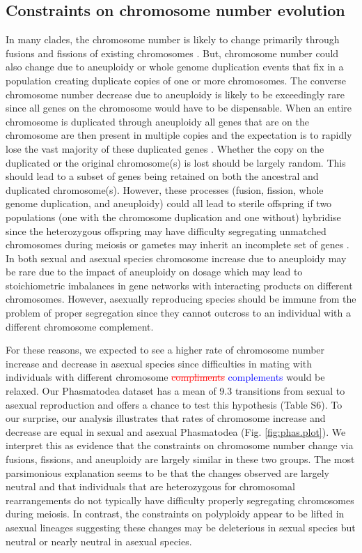 \documentclass[]{rsos}%
\begin{document}
\subsection{Constraints on chromosome number evolution}
In many clades, the chromosome number is likely to change primarily through fusions and fissions of existing chromosomes \cite{sved2016, blackmon2019meiotic}.
But, chromosome number could also change due to aneuploidy or whole genome duplication events that fix in a population creating duplicate copies of one or more chromosomes.
The converse chromosome number decrease due to aneuploidy is likely to be exceedingly rare since all genes on the chromosome would have to be dispensable.
When an entire chromosome is duplicated through aneuploidy all genes that are on the chromosome are then present in multiple copies and the expectation is to rapidly lose the vast majority of these duplicated genes \cite{ohno}.
Whether the copy on the duplicated or the original chromosome(s) is lost should be largely random.
This should lead to a subset of genes being retained on both the ancestral and duplicated chromosome(s).
However, these processes (fusion, fission, whole genome duplication, and aneuploidy) could all lead to sterile offspring if two populations (one with the chromosome duplication and one without) hybridise since the heterozygous offspring may have difficulty segregating unmatched chromosomes during meiosis or gametes may inherit an incomplete set of genes \cite{white1978}.
In both sexual and asexual species chromosome increase due to aneuploidy may be rare due to the impact of aneuploidy on dosage which may lead to stoichiometric imbalances in gene networks with interacting products on different chromosomes.
However, asexually reproducing species should be immune from the problem of proper segregation since they cannot outcross to an individual with a different chromosome complement. 

For these reasons, we expected to see a higher rate of chromosome number increase and decrease in asexual species since difficulties in mating with individuals with different chromosome \textcolor{red}{\st{compliments}} \textcolor{blue}{complements} would be relaxed.
Our Phasmatodea dataset has a mean of 9.3 transitions from sexual to asexual reproduction and offers a chance to test this hypothesis (Table S6).
To our surprise, our analysis illustrates that rates of chromosome increase and decrease are equal in sexual and asexual Phasmatodea (Fig. \ref{fig:phas.plot}).
We interpret this as evidence that the constraints on chromosome number change via fusions, fissions, and aneuploidy are largely similar in these two groups. 
The most parsimonious explanation seems to be that the changes observed are largely neutral and that individuals that are heterozygous for chromosomal rearrangements do not typically have difficulty properly segregating chromosomes during meiosis.
In contrast, the constraints on polyploidy appear to be lifted in asexual lineages suggesting these changes may be deleterious in sexual species but neutral or nearly neutral in asexual species.
\end{document}
